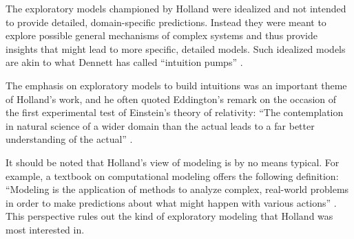 \documentclass{sig-alternate}
\begin{document}

The exploratory models
championed by Holland were idealized and not intended to provide detailed, domain-specific
predictions.  Instead they were meant to explore possible general
mechanisms of complex systems and thus provide insights that might
lead to more specific, detailed models.  Such idealized models are
akin to what Dennett has called ``intuition pumps''
\cite{Dennett1984}.

The emphasis on exploratory models to build intuitions was an
important theme of Holland's work, and he often quoted Eddington's
remark on the occasion of the first experimental test of Einstein's
theory of relativity: ``The contemplation in natural science of a wider
domain than the actual leads to a far better understanding of the
actual'' \cite{Eddington1927}.

It should be noted that Holland's view of modeling is by no means
typical.  For example, a textbook on computational modeling offers
 the following definition: ``Modeling is the application
of methods to analyze complex, real-world problems in order to make
predictions about what might happen with various actions''
\cite{Shiflet2014}.   This perspective rules out the
kind of exploratory modeling that Holland was most interested in. 



\end{document}
